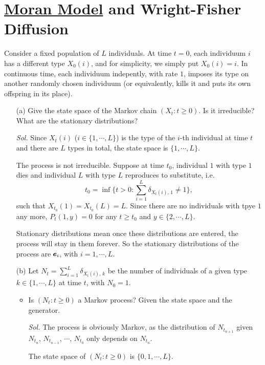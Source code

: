 \section{\href{https://en.wikipedia.org/wiki/Moran_process}{Moran Model} and Wright-Fisher Diffusion}

Consider a fixed population of $L$ individuals. At time $t = 0$, each individuum $i$ has a different type $X_0(i)$, and for simplicity, we simply put $X_0(i) = i$. In continuous time, each individuum indepently, with rate $1$, imposes its type on another randomly chosen individuum (or equivalently, kills it and puts its own offspring in its place).

\begin{enumerate}
    \item[(a)] Give the state space of the Markov chain $(X_t: t\ge 0)$. Is it irreducible? What are the stationary distributions?
    
    \textit{ Sol. } Since $X_t(i)$ ($i \in \{1, \cdots, L\}$) is the type of the $i$-th individual at time $t$ and there are $L$ types in total, the state space is $\{1,\cdots,L\}$. 
    
    The process is not irreducible. Suppose at time $t_0$, individual $1$ with type $1$ dies and individual $L$ with type $L$ reproduces to substitute, i.e. 
    $$
    t_0 = \inf \{t > 0: \sum_{i=1}^L \delta_{X_t(i), \, 1} \neq 1\},
    $$
    such that $X_{t_0}(1) = X_{t_0}(L) = L$. Since there are no individuals with tpye $1$ any more, $P_t(1, y) = 0$ for any $t \ge t_0$ and $y \in \{2, \cdots, L\}$.

    Stationary distributions mean once these distributions are entered, the process will stay in them forever. So the stationary distributions of the process are $\pmb{e}_i$, with $i = 1, \cdots, L$.

    \item[(b)] Let $N_t = \sum_{i=1}^L \delta_{X_t(i),\,k}$ be the number of individuals of a given type $k \in \{1, \cdots, L\}$ at time $t$, with $N_0 = 1$.
        \begin{itemize}
            \item Is $(N_t: t \ge 0)$ a Markov process? Given the state space and the generator.

            \textit{ Sol. } The process is obviously Markov, as the distribution of $N_{t_{n+1}}$ given $N_{t_{n}}$, $N_{t_{n-1}}$, $\cdots$, $N_{t_{0}}$ only depends on $N_{t_{n}}$.

            The state space of  $(N_t: t \ge 0)$ is $\{0, 1, \cdots, L\}$.


\end{itemize}
\end{enumerate}
